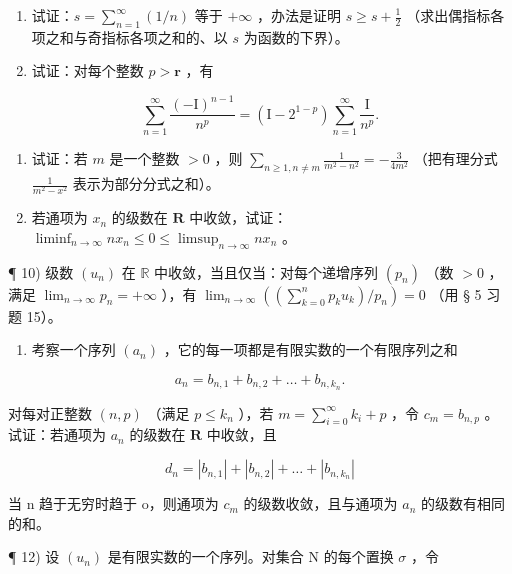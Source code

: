 \begin{enumerate}
\def\labelenumi{\arabic{enumi})}
\setcounter{enumi}{5}
\item
试证：\(s = \sum_{n=1}^{\infty} (1/n)\) 等于 \(+\infty\) ，办法是证明 \(s \geqslant s + \frac{1}{2}\) （求出偶指标各项之和与奇指标各项之和的、以 \(s\) 为函数的下界）。
\item
试证：对每个整数 \(p > \mathbf{r}\) ，有
\end{enumerate}

\[
\sum_ {n = 1} ^ {\infty} \frac {(- \mathrm{I}) ^ {n - 1}}{n ^ {p}} = (\mathrm{I} - 2 ^ {1 - p}) \sum_ {n = 1} ^ {\infty} \frac {\mathrm{I}}{n ^ {p}}.
\]

\begin{enumerate}
\def\labelenumi{\arabic{enumi})}
\setcounter{enumi}{7}
\item
试证：若 \(m\) 是一个整数 \(> 0\) ，则 \(\sum_{n \geqslant 1, n \neq m} \frac{1}{m^2 - n^2} = -\frac{3}{4m^2}\) （把有理分式 \(\frac{1}{m^2 - x^2}\) 表示为部分分式之和）。
\item
若通项为 \(x_{n}\) 的级数在 \(\mathbf{R}\) 中收敛，试证：\(\liminf_{n\to \infty}nx_n\leqslant 0\leqslant \limsup_{n\to \infty}nx_n\) 。
\end{enumerate}

¶ 10) 级数 \((u_n)\) 在 \(\mathbb{R}\) 中收敛，当且仅当：对每个递增序列 \((p_n)\) （数 \(>0\) ，满足 \(\lim_{n\to \infty}p_n = +\infty\) ），有 \(\lim_{n\to \infty}\left(\left(\sum_{k=0}^{n}p_ku_k\right) / p_n\right) = 0\) （用 § 5 习题 15）。

\begin{enumerate}
\def\labelenumi{\arabic{enumi})}
\setcounter{enumi}{10}
\tightlist
\item
考察一个序列 \((a_{n})\) ，它的每一项都是有限实数的一个有限序列之和
\end{enumerate}

\[
a _ {n} = b _ {n, 1} + b _ {n, 2} + \dots + b _ {n, k _ {n}}.
\]

对每对正整数 \((n, p)\) （满足 \(p \leqslant k_n\) ），若 \(m = \sum_{i=0}^{\infty} k_i + p\) ，令 \(c_m = b_{n,p}\) 。试证：若通项为 \(a_n\) 的级数在 \(\mathbf{R}\) 中收敛，且

\[
d _ {n} = \left| b _ {n, 1} \right| + \left| b _ {n, 2} \right| + \dots + \left| b _ {n, k _ {n}} \right|
\]

当 n 趋于无穷时趋于 o，则通项为 \(c_{m}\) 的级数收敛，且与通项为 \(a_{n}\) 的级数有相同的和。

¶ 12) 设 \((u_n)\) 是有限实数的一个序列。对集合 N 的每个置换 \(\sigma\) ，令

